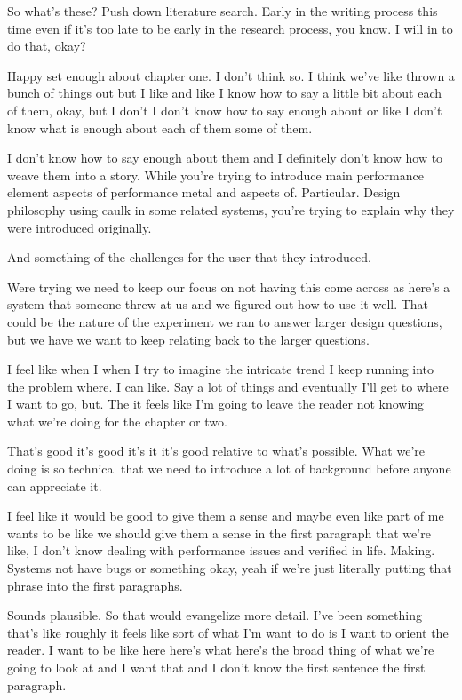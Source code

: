\begin{subappendices}
So what's these? Push down literature search. Early in the writing process this time even if it's too late to be early in the research process, you know. I will in to do that, okay? 

Happy set enough about chapter one. I don't think so. I think we've like thrown a bunch of things out but I like and like I know how to say a little bit about each of them, okay, but I don't I don't know how to say enough about or like I don't know what is enough about each of them some of them. 

I don't know how to say enough about them and I definitely don't know how to weave them into a story. While you're trying to introduce main performance element aspects of performance metal and aspects of. Particular. Design philosophy using caulk in some related systems, you're trying to explain why they were introduced originally. 

And something of the challenges for the user that they introduced. 

Were trying we need to keep our focus on not having this come across as here's a system that someone threw at us and we figured out how to use it well. That could be the nature of the experiment we ran to answer larger design questions, but we have we want to keep relating back to the larger questions. 

I feel like when I when I try to imagine the intricate trend I keep running into the problem where. I can like. Say a lot of things and eventually I'll get to where I want to go, but. The it feels like I'm going to leave the reader not knowing what we're doing for the chapter or two. 

That's good it's good it's it it's good relative to what's possible. What we're doing is so technical that we need to introduce a lot of background before anyone can appreciate it. 

I feel like it would be good to give them a sense and maybe even like part of me wants to be like we should give them a sense in the first paragraph that we're like, I don't know dealing with performance issues and verified in life. Making. Systems not have bugs or something okay, yeah if we're just literally putting that phrase into the first paragraphs. 

Sounds plausible. So that would evangelize more detail. I've been something that's like roughly it feels like sort of what I'm want to do is I want to orient the reader. I want to be like here here's what here's the broad thing of what we're going to look at and I want that and I don't know the first sentence the first paragraph. 


\end{subappendices}
